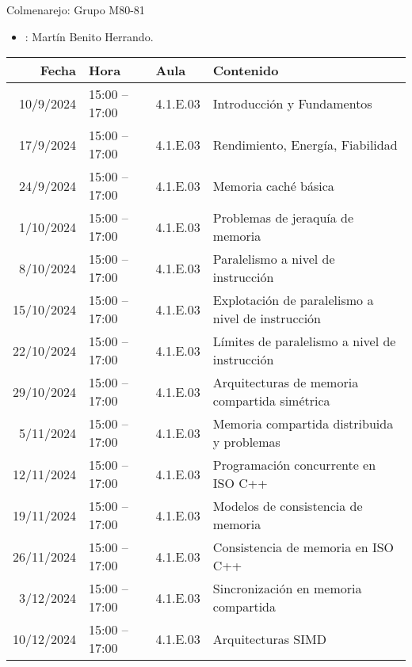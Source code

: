 \begin{frame}[t,plain,shrink=20]{Colmenarejo: Grupo M80-81}
\begin{itemize}
  \item {}: Martín Benito Herrando.
\end{itemize}
\vspace{2em}
\begin{tabular}{|r|l|l|l|}
\hline
Fecha & Hora & Aula & Contenido\\
\hline\hline

10/9/2024 & 15:00 -- 17:00 & 4.1.E.03 & Introducción y Fundamentos\\
\hline
17/9/2024 & 15:00 -- 17:00 & 4.1.E.03 & Rendimiento, Energía, Fiabilidad\\
\hline
24/9/2024 & 15:00 -- 17:00 & 4.1.E.03 & Memoria caché básica\\
\hline
1/10/2024 & 15:00 -- 17:00 & 4.1.E.03 & Problemas de jeraquía de memoria\\
\hline
8/10/2024 & 15:00 -- 17:00 & 4.1.E.03 & Paralelismo a nivel de instrucción\\
\hline
15/10/2024 & 15:00 -- 17:00 & 4.1.E.03 & Explotación de paralelismo a nivel de instrucción\\
\hline
22/10/2024 & 15:00 -- 17:00 & 4.1.E.03 & Límites de paralelismo a nivel de instrucción\\
\hline
29/10/2024 & 15:00 -- 17:00 & 4.1.E.03 & Arquitecturas de memoria compartida simétrica\\
\hline
5/11/2024 & 15:00 -- 17:00 & 4.1.E.03 & Memoria compartida distribuida y problemas\\
\hline
12/11/2024 & 15:00 -- 17:00 & 4.1.E.03 & Programación concurrente en ISO C++\\
\hline
19/11/2024 & 15:00 -- 17:00 & 4.1.E.03 & Modelos de consistencia de memoria\\
\hline
26/11/2024 & 15:00 -- 17:00 & 4.1.E.03 & Consistencia de memoria en ISO C++\\
\hline
3/12/2024 & 15:00 -- 17:00 & 4.1.E.03 & Sincronización en memoria compartida\\
\hline
10/12/2024 & 15:00 -- 17:00 & 4.1.E.03 & Arquitecturas SIMD\\
\hline

\end{tabular}
\end{frame}

